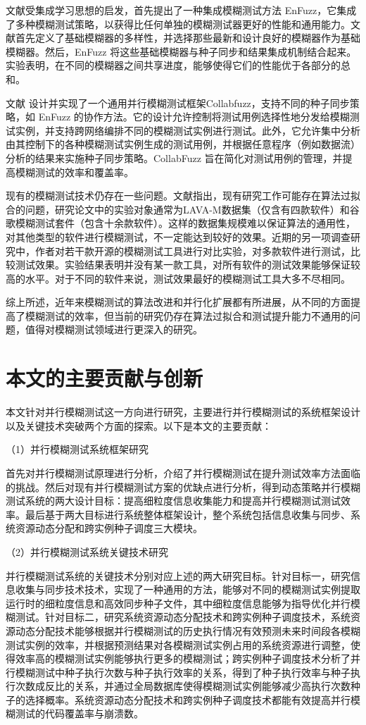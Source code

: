 \documentclass[master]{thesis-uestc}
\begin{document}
文献\cite{chen2019enfuzz}受集成学习思想的启发，首先提出了一种集成模糊测试方法 EnFuzz，它集成了多种模糊测试策略，以获得比任何单独的模糊测试器更好的性能和通用能力。文献首先定义了基础模糊器的多样性，并选择那些最新和设计良好的模糊器作为基础模糊器。然后，EnFuzz 将这些基础模糊器与种子同步和结果集成机制结合起来。实验表明，在不同的模糊器之间共享进度，能够使得它们的性能优于各部分的总和。

文献\cite{osterlund2021collabfuzz} 设计并实现了一个通用并行模糊测试框架Collabfuzz，支持不同的种子同步策略，如 EnFuzz 的协作方法。它的设计允许控制将测试用例选择性地分发给模糊测试实例，并支持跨网络编排不同的模糊测试实例进行测试。此外，它允许集中分析由其控制下的各种模糊测试实例生成的测试用例，并根据任意程序（例如数据流）分析的结果来实施种子同步策略。CollabFuzz 旨在简化对测试用例的管理，并提高模糊测试的效率和覆盖率。

现有的模糊测试技术仍存在一些问题。文献\cite{bohme2021fuzzing}指出，现有研究工作可能存在算法过拟合的问题，研究论文中的实验对象通常为LAVA-M数据集（仅含有四款软件）和谷歌模糊测试套件（包含十余款软件）。这样的数据集规模难以保证算法的通用性，对其他类型的软件进行模糊测试，不一定能达到较好的效果。近期的另一项调查研究中，作者对若干款开源的模糊测试工具进行对比实验，对多款软件进行测试，比较测试效果。实验结果表明并没有某一款工具，对所有软件的测试效果能够保证较高的水平。对于不同的软件来说，测试效果最好的模糊测试工具大多不尽相同。

综上所述，近年来模糊测试的算法改进和并行化扩展都有所进展，从不同的方面提高了模糊测试的效率，但当前的研究仍存在算法过拟合和测试提升能力不通用的问题，值得对模糊测试领域进行更深入的研究。

\section{本文的主要贡献与创新}
本文针对并行模糊测试这一方向进行研究，主要进行并行模糊测试的系统框架设计以及关键技术突破两个方面的探索。以下是本文的主要贡献：

（1）并行模糊测试系统框架研究

首先对并行模糊测试原理进行分析，介绍了并行模糊测试在提升测试效率方法面临的挑战。然后对现有并行模糊测试方案的优缺点进行分析，得到动态策略并行模糊测试系统的两大设计目标：提高细粒度信息收集能力和提高并行模糊测试测试效率。最后基于两大目标进行系统整体框架设计，整个系统包括信息收集与同步、系统资源动态分配和跨实例种子调度三大模块。

（2）并行模糊测试系统关键技术研究

并行模糊测试系统的关键技术分别对应上述的两大研究目标。针对目标一，研究信息收集与同步技术技术，实现了一种通用的方法，能够对不同的模糊测试实例提取运行时的细粒度信息和高效同步种子文件，其中细粒度信息能够为指导优化并行模糊测试。针对目标二，研究系统资源动态分配技术和跨实例种子调度技术，系统资源动态分配技术能够根据并行模糊测试的历史执行情况有效预测未来时间段各模糊测试实例的效率，并根据预测结果对各模糊测试实例占用的系统资源进行调整，使得效率高的模糊测试实例能够执行更多的模糊测试；跨实例种子调度技术分析了并行模糊测试中种子执行次数与种子执行效率的关系，得到了种子执行效率与种子执行次数成反比的关系，并通过全局数据库使得模糊测试实例能够减少高执行次数种子的选择概率。系统资源动态分配技术和跨实例种子调度技术都能有效提高并行模糊测试的代码覆盖率与崩溃数。
\end{document}
